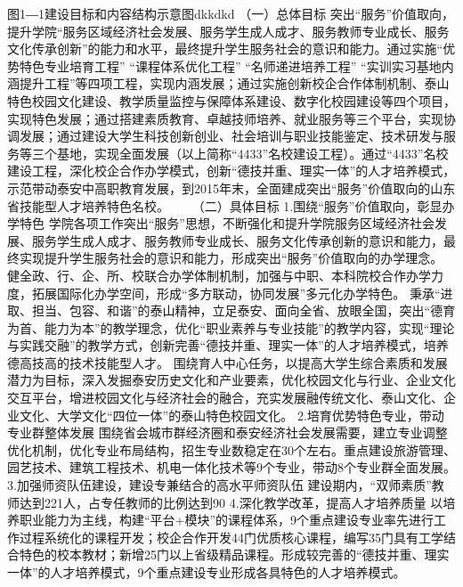 图1―1建设目标和内容结构示意图dkkdkd
（一）总体目标
突出“服务”价值取向，提升学院“服务区域经济社会发展、服务学生成人成才、服务教师专业成长、服务文化传承创新”的能力和水平，最终提升学生服务社会的意识和能力。通过实施“优势特色专业培育工程” “课程体系优化工程” “名师递进培养工程” “实训实习基地内涵提升工程”等四项工程，实现内涵发展；通过实施创新校企合作体制机制、泰山特色校园文化建设、教学质量监控与保障体系建设、数字化校园建设等四个项目，实现特色发展；通过搭建素质教育、卓越技师培养、就业服务等三个平台，实现协调发展；通过建设大学生科技创新创业、社会培训与职业技能鉴定、技术研发与服务等三个基地，实现全面发展（以上简称“4433”名校建设工程）。通过“4433”名校建设工程，深化校企合作办学模式，创新“德技并重、理实一体”的人才培养模式，示范带动泰安中高职教育发展，到2015年末，全面建成突出“服务”价值取向的山东省技能型人才培养特色名校。　　
（二）具体目标
1.围绕“服务”价值取向，彰显办学特色
学院各项工作突出“服务”思想，不断强化和提升学院服务区域经济社会发展、服务学生成人成才、服务教师专业成长、服务文化传承创新的意识和能力，最终实现提升学生服务社会的意识和能力，形成突出“服务”价值取向的办学理念。                      
健全政、行、企、所、校联合办学体制机制，加强与中职、本科院校合作办学力度，拓展国际化办学空间，形成“多方联动，协同发展”多元化办学特色。
秉承“进取、担当、包容、和谐”的泰山精神，立足泰安、面向全省、放眼全国，突出“德育为首、能力为本”的教学理念，优化“职业素养与专业技能”的教学内容，实现“理论与实践交融”的教学方式，创新完善“德技并重、理实一体”的人才培养模式，培养德高技高的技术技能型人才。
围绕育人中心任务，以提高大学生综合素质和发展潜力为目标，深入发掘泰安历史文化和产业要素，优化校园文化与行业、企业文化交互平台，增进校园文化与经济社会的融合，充实发展融传统文化、泰山文化、企业文化、大学文化“四位一体”的泰山特色校园文化。
2.培育优势特色专业，带动专业群整体发展
围绕省会城市群经济圈和泰安经济社会发展需要，建立专业调整优化机制，优化专业布局结构，招生专业数稳定在30个左右。重点建设旅游管理、园艺技术、建筑工程技术、机电一体化技术等9个专业，带动8个专业群全面发展。
3.加强师资队伍建设，建设专兼结合的高水平师资队伍
建设期内，“双师素质”教师达到221人，占专任教师的比例达到90%
4.深化教学改革，提高人才培养质量
以培养职业能力为主线，构建“平台+模块”的课程体系，9个重点建设专业率先进行工作过程系统化的课程开发；校企合作开发44门优质核心课程，编写35门具有工学结合特色的校本教材；新增25门以上省级精品课程。形成较完善的“德技并重、理实一体”的人才培养模式，9个重点建设专业形成各具特色的人才培养模式。
